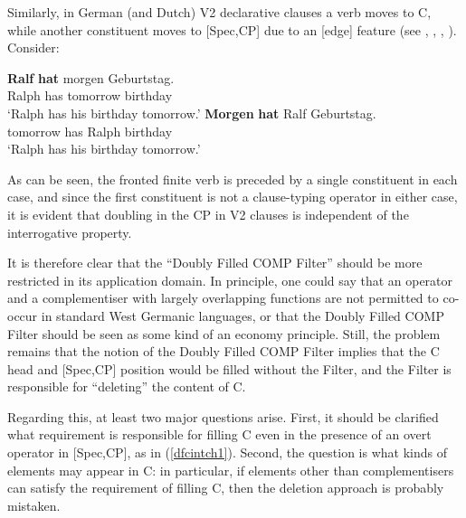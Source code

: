 Similarly, in German (and Dutch) V2 declarative clauses a verb moves to C, while another constituent moves to [Spec,CP] due to an [edge] feature (see \citealt{thiersch1978diss}, \citealt{fanselow2002, fanselow2004isis, fanselow2004}, \citealt{frey2005}, \citealt{denbesten1989}). Consider:

\ea \label{v2ch1}
\ea \gll \textbf{Ralf} \textbf{hat} morgen Geburtstag.\\
Ralph has tomorrow birthday\\
\glt `Ralph has his birthday tomorrow.'
\ex \gll \textbf{Morgen} \textbf{hat} Ralf Geburtstag.\\
tomorrow has Ralph birthday\\
\glt `Ralph has his birthday tomorrow.'
\z
\z

As can be seen, the fronted finite verb is preceded by a single constituent in each case, and since the first constituent is not a clause-typing operator in either case, it is evident that doubling in the CP in V2 clauses is independent of the interrogative property.

It is therefore clear that the ``Doubly Filled COMP Filter'' should be more restricted in its application domain. In principle, one could say that an operator and a complementiser with largely overlapping functions are not permitted to co-occur in standard West Germanic languages, or that the Doubly Filled COMP Filter should be seen as some kind of an economy principle. Still, the problem remains that the notion of the Doubly Filled COMP Filter implies that the C head and [Spec,CP] position would be filled without the Filter, and the Filter is responsible for ``deleting'' the content of C. 

Regarding this, at least two major questions arise. First, it should be clarified what requirement is responsible for filling C even in the presence of an overt operator in [Spec,CP], as in (\ref{dfcintch1}). Second, the question is what kinds of elements may appear in C: in particular, if elements other than complementisers can satisfy the requirement of filling C, then the deletion approach is probably mistaken.

